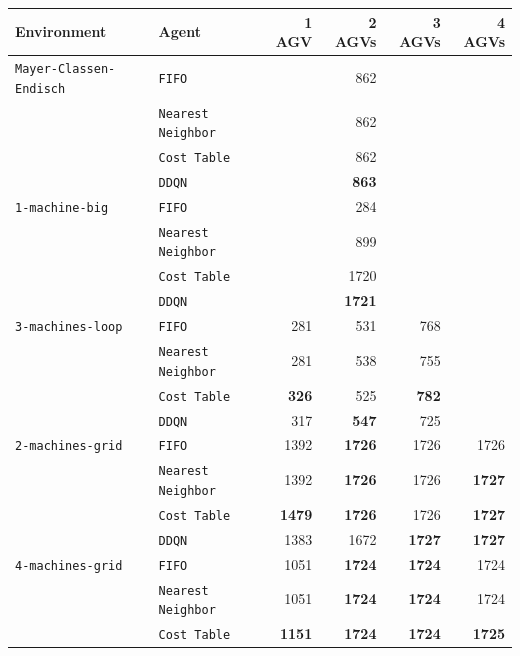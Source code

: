 \documentclass[sn-mathphys]{sn-jnl}
\begin{document}
\begin{table}[ht]
\centering
\bgroup
\def\arraystretch{1.1} %
    
\begin{tabular}{|l|l||r|r|r|r|}
\hline
Environment & Agent & 1 AGV & 2 AGVs & 3 AGVs & 4 AGVs \\
\hline \texttt{Mayer-Classen-Endisch} & \texttt{FIFO}& & 862  \quad & &  \\ 
 & \texttt{Nearest Neighbor} & & 862  \quad & &  \\ 
 & \texttt{Cost Table} & & 862  \quad & &  \\ 
 & \texttt{DDQN} & & \textbf{863} \quad & &  \\ 
\hline \texttt{1-machine-big} & \texttt{FIFO}& & 284  \quad & &  \\ 
 & \texttt{Nearest Neighbor} & & 899  \quad & &  \\ 
 & \texttt{Cost Table} & & 1720  \quad & &  \\ 
 & \texttt{DDQN} & & \textbf{1721} \quad & &  \\ 
\hline \texttt{3-machines-loop} & \texttt{FIFO}& 281  \quad & 531  \quad & 768  \quad &  \\ 
 & \texttt{Nearest Neighbor} & 281  \quad & 538  \quad & 755  \quad &  \\ 
 & \texttt{Cost Table} & \textbf{326} \quad & 525  \quad & \textbf{782} \quad &  \\ 
 & \texttt{DDQN} & 317  \quad & \textbf{547} \quad & 725  \quad &  \\ 
\hline \texttt{2-machines-grid} & \texttt{FIFO}& 1392  \quad & \textbf{1726} \quad & 1726  \quad & 1726  \quad  \\ 
 & \texttt{Nearest Neighbor} & 1392  \quad & \textbf{1726} \quad & 1726  \quad & \textbf{1727} \quad  \\ 
 & \texttt{Cost Table} & \textbf{1479} \quad & \textbf{1726} \quad & 1726  \quad & \textbf{1727} \quad  \\ 
 & \texttt{DDQN} & 1383  \quad & 1672  \quad & \textbf{1727} \quad & \textbf{1727} \quad  \\ 
\hline \texttt{4-machines-grid} & \texttt{FIFO}& 1051  \quad & \textbf{1724} \quad & \textbf{1724} \quad & 1724  \quad  \\ 
 & \texttt{Nearest Neighbor} & 1051  \quad & \textbf{1724} \quad & \textbf{1724} \quad & 1724  \quad  \\ 
 & \texttt{Cost Table} & \textbf{1151} \quad & \textbf{1724} \quad & \textbf{1724} \quad & \textbf{1725} \quad  \\ 

\end{tabular}
\end{table}
\end{document}
